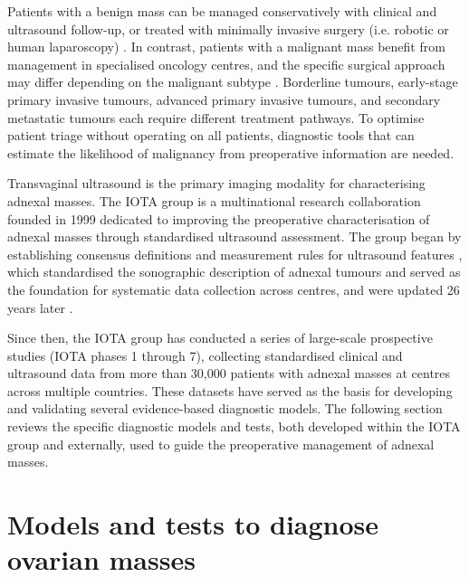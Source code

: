 Patients with a benign mass can be managed conservatively with clinical and ultrasound follow-up, or treated with minimally invasive surgery (i.e. robotic or human laparoscopy) \cite{carleyLaparoscopyLaparotomyManagement2002, froymanRiskComplicationsPatients2019}. In contrast, patients with a malignant mass benefit from management in specialised oncology centres, and the specific surgical approach may differ depending on the malignant subtype \cite{wooCentralisationServicesGynaecological2012, timmermanESGOISUOGIOTA2021}. Borderline tumours, early-stage primary invasive tumours, advanced primary invasive tumours, and secondary metastatic tumours each require different treatment pathways. To optimise patient triage without operating on all patients, diagnostic tools that can estimate the likelihood of malignancy from preoperative information are needed.

Transvaginal ultrasound is the primary imaging modality for characterising adnexal masses. The \gls{IOTA} group is a multinational research collaboration founded in 1999 dedicated to improving the preoperative characterisation of adnexal masses through standardised ultrasound assessment. The group began by establishing consensus definitions and measurement rules for ultrasound features \cite{timmermanTermsDefinitionsMeasurements2000}, which standardised the sonographic description of adnexal tumours and served as the foundation for systematic data collection across centres, and were updated 26 years later \cite{timmermanTermsDefinitionsMeasurements2026}.

Since then, the \gls{IOTA} group has conducted a series of large-scale prospective studies (\gls{IOTA} phases 1 through 7), collecting standardised clinical and ultrasound data from more than 30,000 patients with adnexal masses at centres across multiple countries. These datasets have served as the basis for developing and validating several evidence-based diagnostic models. The following section reviews the specific diagnostic models and tests, both developed within the \gls{IOTA} group and externally, used to guide the preoperative management of adnexal masses.

\section{Models and tests to diagnose ovarian masses}


